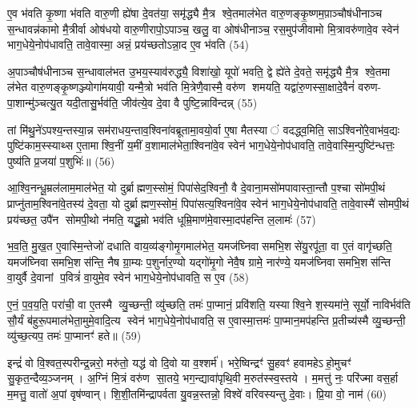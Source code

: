 ए॒व भ॑वति कृ॒ष्णा भ॑वति वारु॒णी ह्ये॑षा दे॒वत॑या॒ समृ॑द्ध्यै मै॒त्र श्वे॒तमाल॑भेत वारु॒णङ्कृ॒ष्णम॒पा़ञ्चौष॑धीनाञ्च स॒न्धावन्न॑कामो मै॒त्रीर्वा ओष॑धयो वारु॒णीरापो॒ऽपाञ्च॒ खलु॒ वा ओष॑धीनाञ्च॒ रस॒मुप॑जीवामो मि॒त्रावरु॑णावे॒व स्वेन॑ भाग॒धेये॒नोप॑धावति॒ तावे॒वास्मा॒ अन्नं॒ प्रय॑च्छतोऽन्ना॒द ए॒व भ॑वति (54)

अ॒पाञ्चौष॑धीनाञ्च स॒न्धावाल॑भत उ॒भय॒स्याव॑रुद्ध्यै॒ विशा॑खो॒ यूपो॑ भवति॒ द्वे ह्ये॑ते दे॒वते॒ समृ॑द्ध्यै मै॒त्र श्वे॒तमा ल॑भेत वारु॒णङ्कृ॒ष्णञ्ज्योगा॑मयावी॒ यन्मै॒त्रो भव॑ति मि॒त्रेणै॒वास्मै॒ वरु॑ण शमयति॒ यद्वा॑रु॒णस्सा॒क्षादे॒वैनं॑ वरुण- पा॒शान्मु॑ञ्चत्यु॒त यदी॒तासु॒र्भव॑ति॒ जीव॑त्ये॒व दे॒वा वै पुष्टि॒न्नावि॑न्दन्न् (55)

तां मि॑थु॒ने॑ऽपश्य॒न्तस्या॒न्न सम॑राधय॒न्ताव॒श्विना॑वब्रूतामा॒वयो॒र्वा ए॒षा मैतस्यां वदद्ध्व॒मिति॒ साऽश्विनो॑रे॒वाभ॑व॒द्यः पुष्टि॑काम॒स्स्याथ्स ए॒तामाश्वि॒नीं य॒मीं व॒शामाल॑भेता॒श्विना॑वे॒व स्वेन॑ भाग॒धेये॒नोप॑धावति॒ तावे॒वास्मि॒न्पुष्टि॑न्धत्तः॒ पुष्य॑ति प्र॒जया॑ प॒शुभिः॑॥ (56)

{\anuvakamend[{अ॒न्ना॒दोऽन्ना॒द ए॒व भ॑वत्यविन्द॒न्पञ्च॑चत्वारिशच्च।9।}]}

आ॒श्वि॒नन्धू॒म्रल॑लाम॒माल॑भेत॒ यो दुर्ब्राह्मण॒स्सोमं॒ पिपा॑सेद॒श्विनौ॒ वै दे॒वाना॒मसो॑मपावास्ता॒न्तौ प॒श्चा सो॑मपी॒थं प्राप्नु॑ताम॒श्विना॑वे॒तस्य॑ दे॒वता॒ यो दुर्ब्राह्मण॒स्सोमं॒ पिपा॑सत्य॒श्विना॑वे॒व स्वेन॑ भाग॒धेये॒नोप॑धावति॒ तावे॒वास्मै॑ सोमपी॒थं प्रय॑च्छत॒ उपै॑न सोमपी॒थो न॑मति॒ यद्धू॒म्रो भव॑ति धूम्रि॒माण॑मे॒वास्मा॒दप॑हन्ति ल॒लामः॑ (57)

भ॒व॒ति॒ मु॒ख॒त ए॒वास्मि॒न्तेजो॑ दधाति वाय॒व्य॑ङ्गोमृ॒गमाल॑भेत॒ यमज॑घ्निवासमभि॒शसे॑यु॒रपू॑ता॒ वा ए॒तं वागृ॑च्छति॒ यमज॑घ्निवासमभि॒शस॑न्ति॒ नैष ग्रा॒म्यः प॒शुर्नार॒ण्यो यद्गो॑मृ॒गो नेवै॒ष ग्रामे॒ नार॑ण्ये॒ यमज॑घ्निवासमभि॒शस॑न्ति वा॒युर्वै दे॒वानां प॒वित्रं॑ वा॒युमे॒व स्वेन॑ भाग॒धेये॒नोप॑धावति॒ स ए॒व (58)

ए॒नं॒ प॒व॒य॒ति॒ परा॑ची॒ वा ए॒तस्मै व्यु॒च्छन्ती॒ व्यु॑च्छति॒ तमः॑ पा॒प्मानं॒ प्रवि॑शति॒ यस्याश्वि॒ने श॒स्यमा॑ने॒ सूर्यो॒ नाविर्भव॑ति सौ॒र्यं ब॑हुरू॒पमाल॑भेता॒मुमे॒वादि॒त्य स्वेन॑ भाग॒धेये॒नोप॑धावति॒ स ए॒वास्मा॒त्तमः॑ पा॒प्मान॒मप॑हन्ति प्र॒तीच्य॑स्मै व्यु॒च्छन्ती॒ व्यु॑च्छ॒त्यप॒ तमः॑ पा॒प्मानꣳ॑ हते॥ (59)

{\anuvakamend[{ल॒लाम॒स्स ए॒व षट्च॑त्वारिशच्च॥10॥}]}

इन्द्रं॑ वो वि॒श्वत॒स्परीन्द्र॒न्नरो॒ मरु॑तो॒ यद्ध॑ वो दि॒वो या व॒श्शर्म॑। भरे॒ष्विन्द्रꣳ॑ सु॒हवꣳ॑ हवामहेऽहो॒मुचꣳ॑ सु॒कृत॒न्दैव्य॒ञ्जनम्। अ॒ग्निं मि॒त्रं वरु॑ण सा॒तये॒ भग॒न्द्यावा॑पृथि॒वी म॒रुत॑स्स्व॒स्तये। म॒मत्तु॑ नः॒ परि॑ज्मा वस॒र्\mbox{}हा म॒मत्तु॒ वातो॑ अ॒पां वृष॑ण्वान्। शि॒शी॒तमि॑न्द्रापर्वता यु॒वन्न॒स्तन्नो॒ विश्वे॑ वरिवस्यन्तु दे॒वाः। प्रि॒या वो॒ नाम॑ (60)

